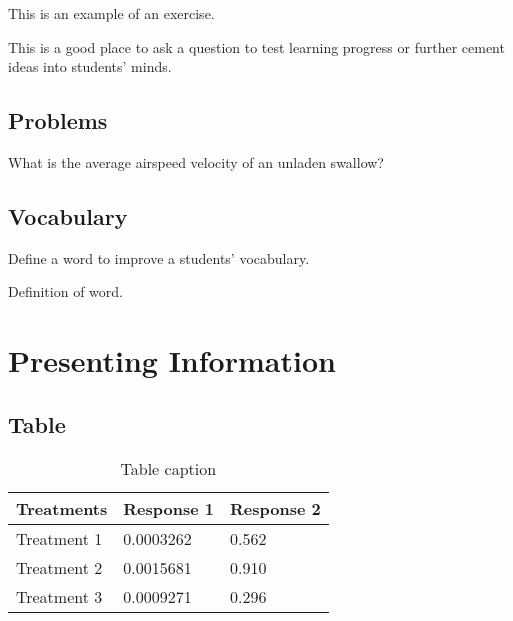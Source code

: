 \documentclass[11pt,fleqn]{book} %
\begin{document}
This is an example of an exercise.

\begin{exercise}
This is a good place to ask a question to test learning progress or further cement ideas into students' minds.
\end{exercise}


\section{Problems}

\begin{problem}
What is the average airspeed velocity of an unladen swallow?
\end{problem}


\section{Vocabulary}

Define a word to improve a students' vocabulary.

\begin{vocabulary}[Word]
Definition of word.
\end{vocabulary}



\chapter{Presenting Information}

\section{Table}

\begin{table}[h]
\centering
\begin{tabular}{l l l}
\toprule
\textbf{Treatments} & \textbf{Response 1} & \textbf{Response 2}\\
\midrule
Treatment 1 & 0.0003262 & 0.562 \\
Treatment 2 & 0.0015681 & 0.910 \\
Treatment 3 & 0.0009271 & 0.296 \\
\bottomrule
\end{tabular}
\caption{Table caption}
\end{table}
\end{document}
